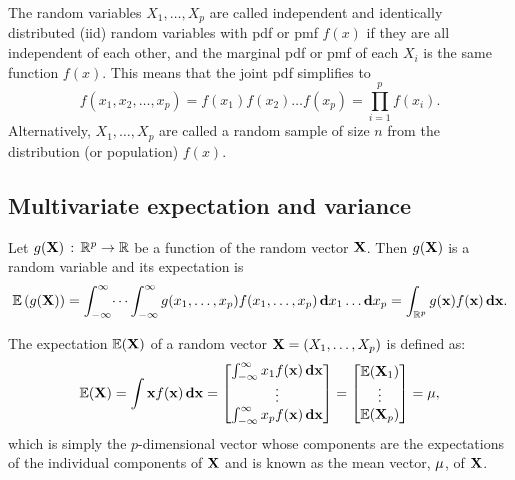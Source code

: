 \documentclass[10pt, a4paper]{article}
\begin{document}
\begin{definition}
    The random variables $X_1, \dotsc, X_p$ are called independent and identically distributed
    (iid)
    random variables with pdf or pmf $f(x)$ if they are all independent of each other,
    and the marginal pdf or pmf of each $X_i$ is the same function $f(x)$.
    This means that the joint pdf simplifies to
    \[
    f(x_1, x_2, \dotsc, x_p) = f(x_1)f(x_2)\dotsc f(x_p) = \prod_{i = 1}^{p}f(x_i).
    \]
    Alternatively,
    $X_1, \dotsc, X_p$ are called a random sample of size $n$ from the distribution
    (or population)
    $f(x)$.
\end{definition}

\subsection{Multivariate expectation and variance}

\begin{definition}
    Let $g(\mathbf{X})\,:\, \mathbb{R} ^ p \to \mathbb{R}$ be a function of the random vector $\mathbf{X}$.
    Then $g(\mathbf{X})$ is a random variable and its expectation is
    \[
    \mathbb{E}\left(g(\mathbf{X})\right) = \int_{-\infty}^{\infty}\dotsi\int_{-\infty}^{\infty}g(x_1, \dotsc, x_p)f(x_1, \dotsc, x_p)\,\mathbf{d}x_1\dotsc\mathbf{d}x_p = \int_{\mathbb{R} ^ p}g(\mathbf{x})f(\mathbf{x})\,\mathbf{dx}.
    \]
\end{definition}

\begin{definition}
    The expectation $\mathbb{E}(\mathbf{X})$ of a random vector $\mathbf{X} = (X_1, \dotsc, X_p)$ is defined as:
    \[
    \mathbb{E}(\mathbf{X}) = \int\mathbf{x}f(\mathbf{x})\,\mathbf{dx} = \begin{bmatrix}
        \int_{-\infty}^{\infty}x_1f(\mathbf{x})\,\mathbf{dx} \\
        \vdots \\
        \int_{-\infty}^{\infty}x_pf(\mathbf{x})\,\mathbf{dx}
    \end{bmatrix}
    =
    \begin{bmatrix}
        \mathbb{E}(\mathbf{X}_1) \\
        \vdots \\
        \mathbb{E}(\mathbf{X}_p)
    \end{bmatrix}
    = \mathbf{\mu},
    \]
    which is simply the $p$-dimensional vector whose components are the expectations of the individual components of $\mathbf{X}$ and is known as the mean vector,
    $\mathbf{\mu}$,
    of $\mathbf{X}$.
\end{definition}
\end{document}
